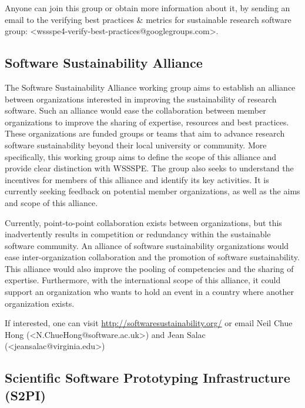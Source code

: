 \documentclass[11pt, oneside]{amsart}
\newcommand{\note}[1]{ {\textcolor{blueish}    { ***Note:      #1 }}}
\begin{document}
Anyone can join this group or obtain more information about it, by sending an email to the verifying best practices \& metrics for sustainable research software group: <wssspe4-verify-best-practices@googlegroups.com>.


\subsection{Software Sustainability Alliance}
\label{sec:alliance}


The Software Sustainability Alliance working group aims to establish an alliance between organizations interested in improving the sustainability of research software. Such an alliance would ease the collaboration between member organizations to improve the sharing of expertise, resources and best practices.
These organizations are funded groups or teams that aim to advance research software sustainability beyond their local university or community. More specifically, this working group aims to define the scope of this alliance and provide clear distinction with WSSSPE. The group also seeks to understand the incentives for members of this alliance and identify its key activities.
It is currently seeking feedback on potential member organizations, as well as the aims and scope of this alliance.

Currently, point-to-point collaboration exists between organizations, but this inadvertently results in competition or redundancy within the sustainable software community. An alliance of software sustainability organizations would ease inter-organization collaboration and the promotion of software sustainability. This alliance would also improve the pooling of competencies and the sharing of expertise. Furthermore, with the international scope of this alliance, it could support an organization who wants to hold an event in a country where another organization exists.

If interested, one can visit \url{http://softwaresustainability.org/} or email Neil Chue Hong (<N.ChueHong@software.ac.uk>) and Jean Salac (<jeansalac@virginia.edu>)

\subsection{Scientific Software Prototyping Infrastructure (S2PI)}
\label{sec:prototyping}
\end{document}
